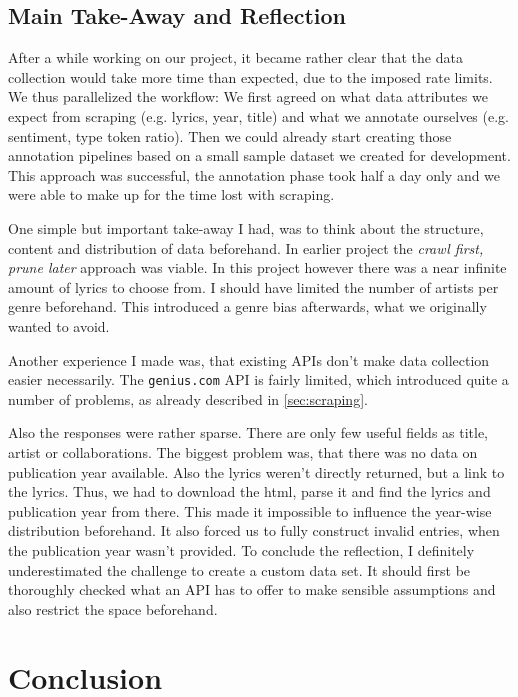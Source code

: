 \documentclass[11pt,a4paper]{article}
\begin{document}
\subsection{Main Take-Away and Reflection}\label{sec:takeaway}

After a while working on our project, it became rather clear that the data collection would take more time than expected, due to the imposed rate limits. We thus parallelized the workflow: We first agreed on what data attributes we expect from scraping (e.g. lyrics, year, title) and what we annotate ourselves (e.g. sentiment, type token ratio). Then we could already start creating those annotation pipelines based on a small sample dataset we created for development. This approach was successful, the annotation phase took half a day only and we were able to make up for the time lost with scraping.  

One simple but important take-away I had, was to think about the structure, content and distribution of data beforehand. In earlier project the \emph{crawl first, prune later} approach was viable. In this project however there was a near infinite amount of lyrics to choose from. I should have limited the number of artists per genre beforehand. This introduced a genre bias afterwards, what we originally wanted to avoid. 

Another experience I made was, that existing APIs don't make data collection easier necessarily. The \texttt{genius.com} API is fairly limited, which introduced quite a number of problems, as already described in \ref{sec:scraping}.

Also the responses were rather sparse. There are only few useful fields as title, artist or collaborations. The biggest problem was, that there was no data on publication year available. Also the lyrics weren't directly returned, but a link to the lyrics. Thus, we had to download the html, parse it and find the lyrics and publication year from there. 
This made it impossible to influence the year-wise distribution beforehand. It also forced us to fully construct invalid entries, when the publication year wasn't provided. 
To conclude the reflection, I definitely underestimated the challenge to create a custom data set. It should first be thoroughly checked what an API has to offer to make sensible assumptions and also restrict the space beforehand.

\section{Conclusion}\label{sec:conclusion}
\end{document}
